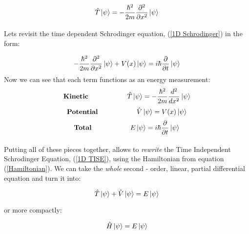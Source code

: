 \documentclass[12pt,letterpaper]{book}
\begin{document}
\begin{equation}
\label{kinetic operator}
\hat{T}\ket{\psi} = -\frac{\hbar ^2}{2m} \frac{\partial^2}{\partial x^2}\ket{\psi}
\end{equation}

\paragraph*{}Lets revisit the time dependent Schrodinger equation, (\ref{1D Schrodinger}) in the form:

\begin{equation}
-\frac{\hbar^2}{2m}\frac{\partial^2}{\partial x^2}\ket{\psi} + V(x)\ket{\psi} = i\hbar\frac{\partial}{\partial t}\ket{\psi}
\end{equation}
Now we can see that each term functions as an energy measurement:
\begin{equation}
\text{\textbf{Kinetic}\hspace{2cm}} \hat{T}\ket{\psi} = -\frac{\hbar^2}{2m}\frac{d^2}{dx^2}\ket{\psi}
\end{equation}
\begin{equation}
\text{\textbf{Potential}\hspace{2cm}} \hat{V}\ket{\psi} = V(x)\ket{\psi}
\end{equation}
\begin{equation}
\text{\textbf{Total}\hspace{2cm}}  E\ket{\psi} = i\hbar\frac{\partial}{\partial t}\ket{\psi}
\end{equation} 

\paragraph*{}Putting all of these pieces together, allows to \textit{rewrite} the Time Independent Schrodinger Equation, (\ref{1D TISE}), using the Hamiltonian from equation (\ref{Hamiltonian}). We can take the \textit{whole} second - order, linear, partial differential equation and turn it into:

\begin{equation}
\hat{T}\ket{\psi} + \hat{V}\ket{\psi} = E\ket{\psi}
\end{equation}

or more compactly:

\begin{equation}
\label{Hamiltonian EVP}
\hat{H}\ket{\psi} = E\ket{\psi}
\end{equation}
\end{document}
